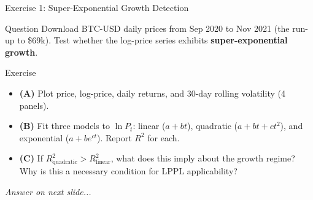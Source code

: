 \documentclass[9pt, aspectratio=169, t]{beamer}
\begin{document}
\begin{frame}{Exercise 1: Super-Exponential Growth Detection}
    \begin{cminipage}{0.95\textwidth}
    \begin{alertblock}{Question}
        Download BTC-USD daily prices from Sep 2020 to Nov 2021 (the run-up to \$69k).
        Test whether the log-price series exhibits \textbf{super-exponential growth}.
    \end{alertblock}

    \vspace{0.2cm}

    \begin{block}{Exercise}
        \begin{itemize}\setlength{\itemsep}{3pt}
            \item \textcolor{MainBlue}{\textbf{(A)}} Plot price, log-price, daily returns, and 30-day rolling volatility (4 panels).
            \item \textcolor{MainBlue}{\textbf{(B)}} Fit three models to $\ln P_t$: linear ($a + bt$), quadratic ($a + bt + ct^2$), and exponential ($a + be^{ct}$). Report $R^2$ for each.
            \item \textcolor{MainBlue}{\textbf{(C)}} If $R^2_{\text{quadratic}} > R^2_{\text{linear}}$, what does this imply about the growth regime? Why is this a necessary condition for LPPL applicability?
        \end{itemize}
    \end{block}

    \vspace{0.2cm}

    \begin{center}
        \textit{Answer on next slide...}
    \end{center}
    \end{cminipage}
\end{frame}
\end{document}
